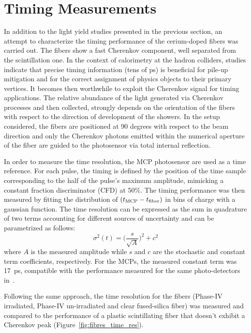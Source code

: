 \documentclass[a4paper,11pt]{article}
\begin{document}
\section{Timing Measurements}
\label{sec:timing}
In addition to the light yield studies presented in the previous section, an attempt to characterize the timing performance of the cerium-doped fibers was carried out. The fibers show a fast Cherenkov component, well separated from the scintillation one. In the context of calorimetry at the hadron colliders, studies indicate that precise timing information (tens of ps) is beneficial for pile-up mitigation and for the correct assignment of physics objects to their primary vertices. It becomes then worthwhile to exploit the Cherenkov signal for timing applications.  The relative abundance of the light generated via Cherenkov processes and then collected, strongly depends on the orientation of the fibers with respect to the direction of development of the showers. In the setup considered, the fibers are positioned at 90 degrees with respect to the beam direction and only the Cherenkov photons emitted within the numerical aperture of the fiber are guided to the photosensor via total internal reflection.

In order to measure the time resolution, the MCP photosensor are used as a time reference. For each pulse, the timing is defined by the position of the time sample corresponding to the half of the pulse's maximum amplitude, mimicking a constant fraction discriminator (CFD) at 50\%. The timing performance was then measured by fitting the distribution of $(t_{\rm MCP} - t_{\rm fiber})$ in bins of charge with a gaussian function.  The time resolution can be expressed as the sum in quadrature of two terms accounting for different sources of uncertainty and can be parametrized as follows:
\begin{equation}
    \sigma^2(t) = \bigg( \frac{s}{\sqrt{A}} \bigg)^2 + c^2
\end{equation}
where $A$ is the measured amplitude while $s$ and $c$ are the stochastic and constant term coefficients, respectively. For the MCPs, the measured constant term was 17~ps, compatible with the performance measured for the same photo-detectors in~\cite{r-MCP}.

Following the same approach, the time resolution for the fibers (Phase-IV irradiated, Phase-IV un-irradiated and clear fused-silica fiber) was measured and compared to the performance of a plastic scintillating fiber that doesn't exhibit a Cherenkov peak (Figure~\ref{fig:fibres_time_res}).
\end{document}
